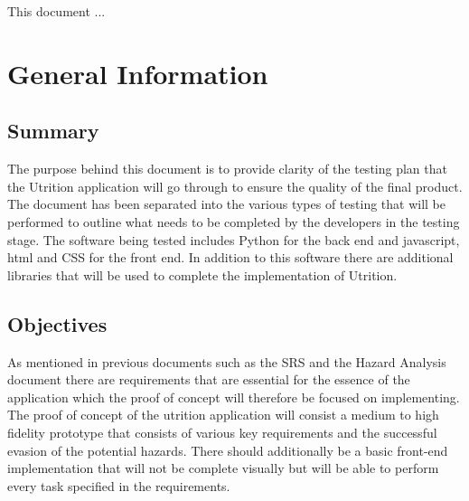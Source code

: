 \documentclass[12pt, titlepage]{article}
\begin{document}
	
	\newpage
	
	
	This document ... 
	
	\section{General Information}
	
	\subsection{Summary}
	
		The purpose behind this document is to provide clarity of the testing plan that the Utrition application will go through to ensure the quality of the final product. The document has been separated into the various types of testing that will be performed to outline what needs to be completed by the developers in the testing stage. The software being tested includes Python for the back end and javascript, html and CSS for the front end. In addition to this software there are additional libraries that will be used to complete the implementation of Utrition. 
	
	\subsection{Objectives}
	
		
		As mentioned in previous documents such as the SRS and the Hazard Analysis document there are requirements that are essential for the essence of the application which the proof of concept will therefore be focused on implementing. The proof of concept of the utrition application will consist a medium to high fidelity prototype that consists of various key requirements and the successful evasion of the potential hazards. There should additionally be a basic front-end implementation that will not be complete visually but will be able to perform every task specified in the requirements. 
\end{document}
